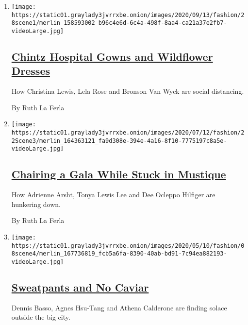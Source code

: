 \begin{enumerate}
\def\labelenumi{\arabic{enumi}.}
\item
  \texttt{[image: https://static01.graylady3jvrrxbe.onion/images/2020/09/13/fashion/28scene1/merlin\_158593002\_b96c4e6d-6c4a-498f-8aa4-ca21a37e2fb7-videoLarge.jpg]}

  \hypertarget{chintz-hospital-gowns-and-wildflower-dresses}{%
  \subsection{\texorpdfstring{\href{/2020/08/28/style/chintz-hospital-gowns-and-wildflower-dresses.html}{Chintz
  Hospital Gowns and Wildflower
  Dresses}}{Chintz Hospital Gowns and Wildflower Dresses}}\label{chintz-hospital-gowns-and-wildflower-dresses}}

  How Christina Lewis, Lela Rose and Bronson Van Wyck are social
  distancing.

  By Ruth La Ferla
\item
  \texttt{[image: https://static01.graylady3jvrrxbe.onion/images/2020/07/12/fashion/22Scene3/merlin\_164363121\_fa9d308e-394e-4a16-8f10-7775197c8a5e-videoLarge.jpg]}

  \hypertarget{chairing-a-gala-while-stuck-in-mustique}{%
  \subsection{\texorpdfstring{\href{/2020/05/25/style/chairing-a-gala-while-stuck-in-mustique.html}{Chairing
  a Gala While Stuck in
  Mustique}}{Chairing a Gala While Stuck in Mustique}}\label{chairing-a-gala-while-stuck-in-mustique}}

  How Adrienne Arsht, Tonya Lewis Lee and Dee Ocleppo Hilfiger are
  hunkering down.

  By Ruth La Ferla
\item
  \texttt{[image: https://static01.graylady3jvrrxbe.onion/images/2020/05/10/fashion/08scene4/merlin\_167736819\_fcb5a6fa-8390-40ab-bd91-7c94ea882193-videoLarge.jpg]}

  \hypertarget{sweatpants-and-no-caviar}{%
  \subsection{\texorpdfstring{\href{/2020/05/08/style/sweatpants-and-no-caviar.html}{Sweatpants
  and No
  Caviar}}{Sweatpants and No Caviar}}\label{sweatpants-and-no-caviar}}

  Dennis Basso, Agnes Hsu-Tang and Athena Calderone are finding solace
  outside the big city.


\end{enumerate}
